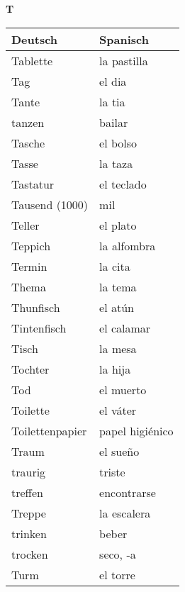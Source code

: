 \begin{flushright}\begin{Huge}\textbf{T}\end{Huge}\end{flushright}

\begin{longtable}{p{} p{}} 
\textbf{Deutsch}     & \textbf{Spanisch}                                       \\ \hline
\hline
\endhead %
Tablette & la pastilla\\
Tag & el dia \\
Tante & la tia\\
tanzen & bailar\\
Tasche & el bolso\\
Tasse & la taza\\
Tastatur & el teclado\\
Tausend (1000) & mil\\
Teller & el plato\\
Teppich & la alfombra\\
Termin & la cita\\
Thema & la tema\\
Thunfisch & el atún\\
Tintenfisch & el calamar\\
Tisch & la mesa\\
Tochter & la hija\\
Tod & el muerto\\
Toilette & el váter\\
Toilettenpapier & papel higiénico\\
Traum & el sueño\\
traurig & triste \\
treffen & encontrarse\\
Treppe & la escalera\\
trinken & beber\\
trocken & seco, -a\\
Turm & el torre\\

\end{longtable}
